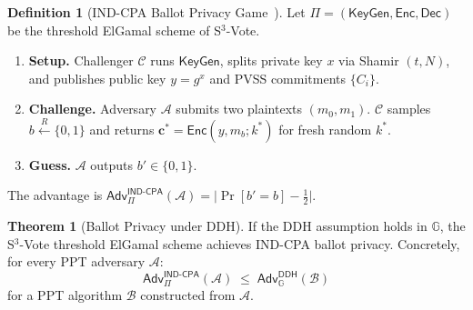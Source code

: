 \documentclass[12pt,a4paper]{article}
\theoremstyle{definition}
\newtheorem{definition}{Definition}[section]
\newtheorem{theorem}{Theorem}[section]
\theoremstyle{remark}
\begin{document}
\begin{definition}[IND-CPA Ballot Privacy Game~\cite{katzlindell2014}]
  Let $\Pi = (\mathsf{KeyGen}, \mathsf{Enc}, \mathsf{Dec})$ be the
  threshold ElGamal scheme of S$^3$-Vote.
  \begin{enumerate}
    \item \textbf{Setup.} Challenger $\mathcal{C}$ runs $\mathsf{KeyGen}$,
      splits private key $x$ via Shamir $(t, N)$, and publishes
      public key $y = g^x$ and PVSS commitments $\{C_i\}$.
    \item \textbf{Challenge.} Adversary $\mathcal{A}$ submits two plaintexts
      $(m_0, m_1)$. $\mathcal{C}$ samples $b \xleftarrow{R} \{0,1\}$ and
      returns $\mathbf{c}^* = \mathsf{Enc}(y, m_b; k^*)$ for fresh random $k^*$.
    \item \textbf{Guess.} $\mathcal{A}$ outputs $b' \in \{0,1\}$.
  \end{enumerate}
  The advantage is
  $\mathsf{Adv}^{\mathsf{IND\text{-}CPA}}_\Pi(\mathcal{A})
  = \bigl|\Pr[b' = b] - \tfrac{1}{2}\bigr|$.
\end{definition}

\begin{theorem}[Ballot Privacy under DDH]
\label{thm:indcpa}
  If the DDH assumption holds in $\mathbb{G}$, the S$^3$-Vote threshold
  ElGamal scheme achieves IND-CPA ballot privacy.
  Concretely, for every PPT adversary $\mathcal{A}$:
  \begin{equation}
    \mathsf{Adv}^{\mathsf{IND\text{-}CPA}}_\Pi(\mathcal{A})
    \;\leq\;
    \mathsf{Adv}^{\mathsf{DDH}}_\mathbb{G}(\mathcal{B})
  \end{equation}
  for a PPT algorithm $\mathcal{B}$ constructed from $\mathcal{A}$.
\end{theorem}
\end{document}
